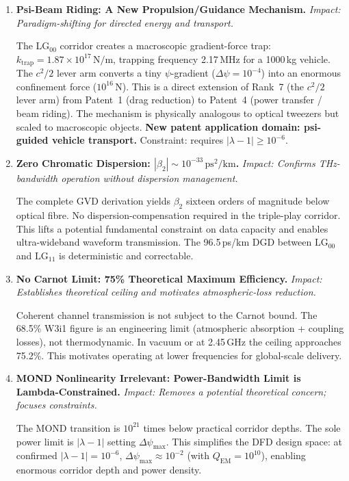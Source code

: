 \documentclass[aps,prd,twocolumn,superscriptaddress]{revtex4-2}
\newcommand{\LG}{\mathrm{LG}}
\begin{document}
\begin{enumerate}

\item \textbf{Psi-Beam Riding: A New Propulsion/Guidance Mechanism.}
\textit{Impact: Paradigm-shifting for directed energy and transport.}

The LG$_{00}$ corridor creates a macroscopic gradient-force trap:
$k_\mathrm{trap} = 1.87\times10^{17}\,\mathrm{N/m}$, trapping frequency
2.17\,MHz for a 1000\,kg vehicle.  The $c^2/2$ lever arm converts
a tiny $\psi$-gradient ($\Delta\psi = 10^{-4}$) into an enormous
confinement force ($10^{16}\,\mathrm{N}$).  This is a direct extension
of Rank~7 (the $c^2/2$ lever arm) from Patent~1 (drag reduction) to
Patent~4 (power transfer / beam riding).  The mechanism is physically
analogous to optical tweezers but scaled to macroscopic objects.
\textbf{New patent application domain: psi-guided vehicle transport.}
Constraint: requires $|\lambda-1|\geq10^{-6}$.

\item \textbf{Zero Chromatic Dispersion: $|\beta_2|\sim10^{-33}\,\mathrm{ps}^2/\mathrm{km}$.}
\textit{Impact: Confirms THz-bandwidth operation without dispersion management.}

The complete GVD derivation yields $\beta_2$ sixteen orders of magnitude
below optical fibre.  No dispersion-compensation required in the
triple-play corridor.  This lifts a potential fundamental constraint
on data capacity and enables ultra-wideband waveform transmission.
The 96.5\,ps/km DGD between $\LG_{00}$ and $\LG_{11}$ is deterministic
and correctable.

\item \textbf{No Carnot Limit: 75\% Theoretical Maximum Efficiency.}
\textit{Impact: Establishes theoretical ceiling and motivates atmospheric-loss reduction.}

Coherent channel transmission is not subject to the Carnot bound.
The 68.5\% W3i1 figure is an engineering limit (atmospheric absorption
+ coupling losses), not thermodynamic.  In vacuum or at 2.45\,GHz
the ceiling approaches 75.2\%.  This motivates operating at lower
frequencies for global-scale delivery.

\item \textbf{MOND Nonlinearity Irrelevant: Power-Bandwidth Limit is Lambda-Constrained.}
\textit{Impact: Removes a potential theoretical concern; focuses constraints.}

The MOND transition is $10^{21}$ times below practical corridor depths.
The sole power limit is $|\lambda-1|$ setting $\Delta\psi_\mathrm{max}$.
This simplifies the DFD design space: at confirmed $|\lambda-1| = 10^{-6}$,
$\Delta\psi_\mathrm{max} \approx 10^{-2}$ (with $Q_\mathrm{EM} = 10^{10}$),
enabling enormous corridor depth and power density.


\end{enumerate}
\end{document}
